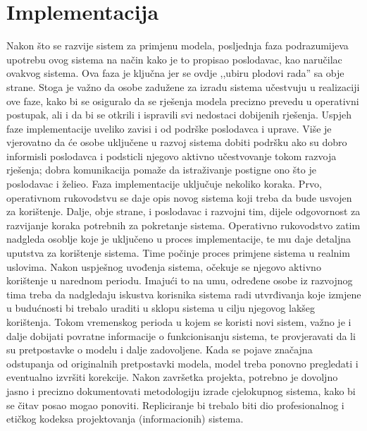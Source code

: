 \documentclass[b5paper, utf8, 11pt, colorlinks]{book}
\theoremstyle{definition}
\begin{document}
 \section{Implementacija}

 Nakon što se razvije sistem za primjenu modela, posljednja faza  podrazumijeva upotrebu ovog sistema  na način kako je to propisao poslodavac, kao naručilac ovakvog sistema. Ova faza je ključna jer se ovdje ,,ubiru plodovi rada'' sa obje strane. Stoga je važno da osobe zadužene za izradu sistema  učestvuju u  realizaciji ove faze, kako bi se osiguralo da se rješenja modela precizno prevedu u operativni postupak, ali i da bi se otkrili i ispravili svi nedostaci dobijenih rješenja. Uspjeh faze implementacije uveliko zavisi i od podrške poslodavca i uprave. Više je vjerovatno da će osobe uključene u razvoj sistema dobiti podršku ako su dobro informisli poslodavca i podsticli njegovo aktivno učestvovanje tokom razvoja rješenja; dobra komunikacija pomaže da istraživanje postigne ono što je poslodavac i želieo.  Faza implementacije uključuje nekoliko koraka. Prvo,  operativnom rukovodstvu se daje opis novog sistema koji treba da bude usvojen za korištenje. Dalje, obje strane, i poslodavac i razvojni tim, dijele odgovornost za razvijanje koraka potrebnih za pokretanje sistema. Operativno rukovodstvo zatim nadgleda  osoblje koje je uključeno u proces implementacije, te mu daje detaljna uputstva za korištenje sistema. Time počinje proces primjene sistema u realnim uslovima. Nakon uspješnog uvođenja sistema, očekuje se njegovo aktivno korištenje u narednom periodu. Imajući to na umu, određene osobe iz razvojnog tima treba da nadgledaju iskustva korisnika sistema radi utvrđivanja koje izmjene u budućnosti bi trebalo uraditi u sklopu  sistema u cilju njegovog lakšeg korištenja.  Tokom vremenskog perioda u kojem se koristi novi sistem, važno je i dalje dobijati povratne informacije o funkcionisanju sistema, te provjeravati da li su pretpostavke o modelu i dalje zadovoljene. Kada se pojave značajna odstupanja od originalnih pretpostavki modela, model treba ponovno pregledati i eventualno izvršiti korekcije. Nakon završetka projekta, potrebno je   dovoljno jasno i precizno dokumentovati  metodologiju izrade cjelokupnog sistema, kako bi se čitav posao mogao ponoviti. Repliciranje bi trebalo
 biti dio profesionalnog i etičkog kodeksa projektovanja (informacionih) sistema.  %
\end{document}
